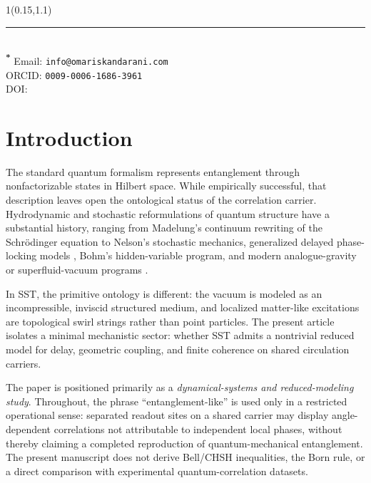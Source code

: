 \documentclass[11pt]{article}
\begin{document}
\begin{textblock*}{1\textwidth}(0.15\textwidth,1.1\textheight)\raggedright\footnotesize
    \noindent\rule{\textwidth}{0.4pt}\\[0.5em]
    \textsuperscript{\textbf{*}} Email: \texttt{info@omariskandarani.com}\\
    ORCID: \texttt{0009-0006-1686-3961}\\
    DOI: \href{https://doi.org/\paperdoi}{\paperdoi}
\end{textblock*}

\newpage

\section{Introduction}

The standard quantum formalism represents entanglement through nonfactorizable states in Hilbert space. While empirically successful, that description leaves open the ontological status of the correlation carrier. Hydrodynamic and stochastic reformulations of quantum structure have a substantial history, ranging from Madelung's continuum rewriting of the Schr\"odinger equation to Nelson's stochastic mechanics, generalized delayed phase-locking models \cite{Yeung1999}, Bohm's hidden-variable program, and modern analogue-gravity or superfluid-vacuum programs \cite{Madelung1927,Nelson1966,Bohm1952,Barcelo2011,Volovik2003}.

In SST, the primitive ontology is different: the vacuum is modeled as an incompressible, inviscid structured medium, and localized matter-like excitations are topological swirl strings rather than point particles. The present article isolates a minimal mechanistic sector: whether SST admits a nontrivial reduced model for delay, geometric coupling, and finite coherence on shared circulation carriers.

The paper is positioned primarily as a \emph{dynamical-systems and reduced-modeling study}. Throughout, the phrase ``entanglement-like'' is used only in a restricted operational sense: separated readout sites on a shared carrier may display angle-dependent correlations not attributable to independent local phases, without thereby claiming a completed reproduction of quantum-mechanical entanglement. The present manuscript does not derive Bell/CHSH inequalities, the Born rule, or a direct comparison with experimental quantum-correlation datasets.
\end{document}
